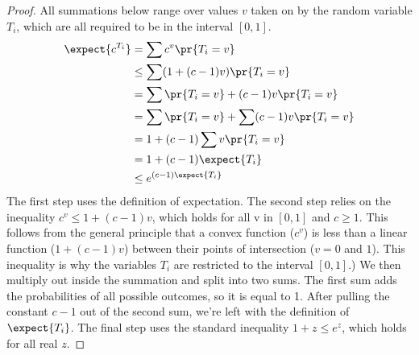 \begin{proof}
All summations below range over values $v$ taken on by the random
variable $T_i$, which are all required to be in the interval $[0, 1]$.
\begin{align*}
\expect{c^{T_i}} & = \sum c^v \pr{T_i = v} \\
           & \leq \sum (1 + (c-1) v) \pr{T_i = v} \\
           & = \sum \pr{T_i = v} + (c-1) v \pr{T_i = v} \\
           & = \sum \pr{T_i = v} + \sum(c-1) v \pr{T_i = v} \\
           & = 1 + (c - 1) \sum v \pr{T_i = v} \\
           & = 1 + (c - 1) \expect{T_i} \\
           & \leq e^{(c - 1) \expect{T_i}}
\end{align*}
The first step uses the definition of expectation.  The second step
relies on the inequality $c^v \leq 1 + (c-1) v$, which holds for all v
in $[0,1]$ and $c \geq 1$.  This follows from the general principle that a
convex function ($c^v$) is less than a linear function ($1 + (c-1) v$)
between their points of intersection ($v = 0$ and $1$).  This
inequality is why the variables $T_i$ are restricted to the interval
$[0, 1]$.)  We then multiply out inside the summation and split into
two sums.  The first sum adds the probabilities of all possible
outcomes, so it is equal to 1.  After pulling the constant $c - 1$ out
of the second sum, we're left with the definition of $\expect{T_i}$.  The
final step uses the standard inequality $1 + z \leq e^z$, which holds
for all real $z$.
\end{proof}

\begin{problems}
\classproblems

\end{problems}
\endinput
